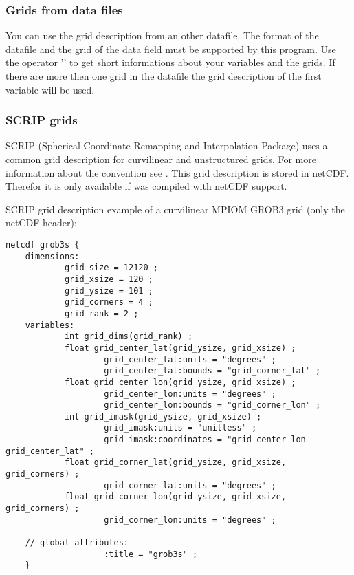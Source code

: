 \subsubsection{Grids from data files}

You can use the grid description from an other datafile.
The format of the datafile and the grid of the data field must
be supported by this program.
Use the operator '' to get short informations about
your variables and the grids.
If there are more then one grid in the datafile the grid description of
the first variable will be used.

\subsubsection{SCRIP grids}

SCRIP (Spherical Coordinate Remapping and Interpolation Package) uses
a common grid description for curvilinear and unstructured grids.
For more information about the convention see \cite{SCRIP}.
This grid description is stored in netCDF. Therefor it is only
available if {\CDO} was compiled with netCDF support.

\vspace{2mm}

SCRIP grid description example of a curvilinear MPIOM \cite{MPIOM} GROB3 grid (only the netCDF header):
\begin{lstlisting}[frame=single, backgroundcolor=\color{pcolor1}, basicstyle=\footnotesize]
    netcdf grob3s {
    dimensions:
            grid_size = 12120 ;
            grid_xsize = 120 ;
            grid_ysize = 101 ;
            grid_corners = 4 ;
            grid_rank = 2 ;
    variables:
            int grid_dims(grid_rank) ;
            float grid_center_lat(grid_ysize, grid_xsize) ;
                    grid_center_lat:units = "degrees" ;
                    grid_center_lat:bounds = "grid_corner_lat" ;
            float grid_center_lon(grid_ysize, grid_xsize) ;
                    grid_center_lon:units = "degrees" ;
                    grid_center_lon:bounds = "grid_corner_lon" ;
            int grid_imask(grid_ysize, grid_xsize) ;
                    grid_imask:units = "unitless" ;
                    grid_imask:coordinates = "grid_center_lon grid_center_lat" ;
            float grid_corner_lat(grid_ysize, grid_xsize, grid_corners) ;
                    grid_corner_lat:units = "degrees" ;
            float grid_corner_lon(grid_ysize, grid_xsize, grid_corners) ;
                    grid_corner_lon:units = "degrees" ;

    // global attributes:
                    :title = "grob3s" ;
    }
\end{lstlisting}

